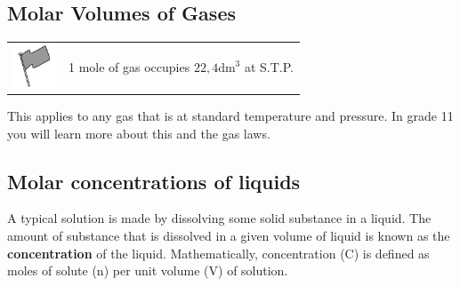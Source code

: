             \subsection{ Molar Volumes of Gases}
            \nopagebreak
            \par
            \label{m38712*eip-id1168064596799}\begin{definition}
	  \begin{tabular*}{15 cm}{m{15 mm}m{}}
	\hspace*{-50pt}  \includegraphics[width=0.5in]{col11305.imgs/psflag2.png}   & \Definition{   \label{id2504818}\textbf{Molar volume of gases}} { \label{m38712*eip-id1168053572222}1 mole of gas occupies $22,4{\mathrm{dm}}^{3}$ at S.T.P. } 
      \end{tabular*}
      \end{definition}
      \label{m38712*id282112}This applies to any gas that is at standard temperature and pressure. In grade 11 you will learn more about this and the gas laws.\par 
    \label{m38712*cid8}
            \subsection{ Molar concentrations of liquids}
            \nopagebreak
      \label{m38712*id282848}A typical solution is made by dissolving some solid substance in a liquid. The amount of substance that is dissolved in a given volume of liquid is known as the \textbf{concentration} of the liquid. Mathematically, concentration (C) is defined as moles of solute (n) per unit volume (V) of solution.\par 
      \label{m38712*id282860}\nopagebreak\noindent{}
        
